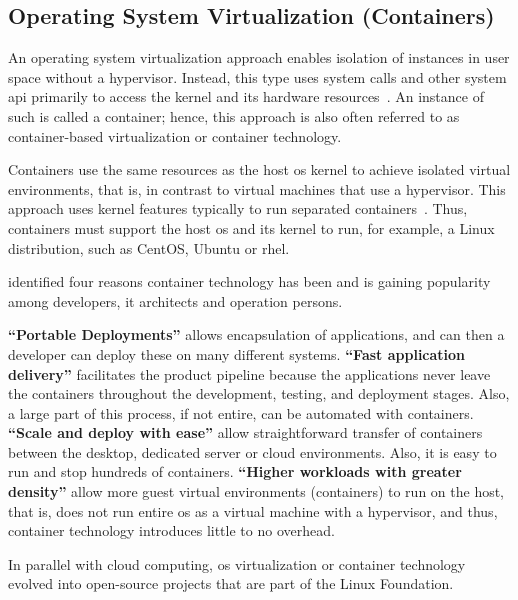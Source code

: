 

\subsection{Operating System Virtualization (Containers)}\label{background:osvirtual}

An operating system virtualization approach enables isolation of instances in user space without a hypervisor.
Instead, this type uses system calls and other system \gls{api} primarily to access the kernel and its hardware resources~\cite{bauer2012reliability}.
An instance of such is called a container; hence, this approach is also often referred to as container-based virtualization or container technology.

\hfill\break
\hfill\break
\hfill\break

\skippara Containers use the same resources as the host \gls{os} kernel to achieve isolated virtual environments, that is, in contrast to virtual machines that use a hypervisor.
This approach uses kernel features typically to run separated containers~\cite{xavier2013performance, namespac0:online}.
Thus, containers must support the host \gls{os} and its kernel to run, for example, a Linux distribution, such as CentOS, Ubuntu or \gls{rhel}.

\skippara \citet*{joy2015performance} identified four reasons container technology has been and is gaining popularity among developers, \gls{it} architects and operation persons.

\skippara \textbf{``Portable Deployments''} allows encapsulation of applications, and can then a developer can deploy these on many different systems.
\skippara \textbf{``Fast application delivery''} facilitates the product pipeline because the applications never leave the containers throughout the development, testing, and deployment stages. Also, a large part of this process, if not entire, can be automated with containers.
\skippara \textbf{``Scale and deploy with ease''} allow straightforward transfer of containers between the desktop, dedicated server or cloud environments. Also, it is easy to run and stop hundreds of containers.
\skippara \textbf{``Higher workloads with greater density''} allow more guest virtual environments (containers) to run on the host, that is, does not run entire \gls{os} as a virtual machine with a hypervisor, and thus, container technology introduces little to no overhead.

\skippara In parallel with cloud computing, \gls{os} virtualization or container technology evolved into open-source projects that are part of the Linux Foundation.

